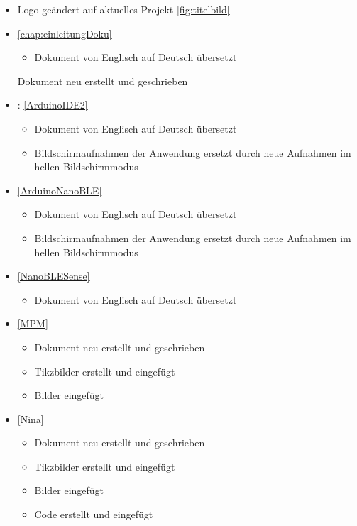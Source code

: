 \begin{itemize}
	\item {} Logo geändert auf aktuelles Projekt \ref{fig:titelbild}
	\item {}\ref{chap:einleitungDoku}
\begin{itemize}
	\item Dokument von Englisch auf Deutsch übersetzt
\end{itemize} Dokument neu erstellt und geschrieben 

\item {}: \ref{ArduinoIDE2}
\begin{itemize}
	\item Dokument von Englisch auf Deutsch übersetzt
	\item Bildschirmaufnahmen der Anwendung ersetzt durch neue Aufnahmen im hellen Bildschirmmodus
\end{itemize}

\item {}\ref{ArduinoNanoBLE}
\begin{itemize}
	\item Dokument von Englisch auf Deutsch übersetzt
	\item Bildschirmaufnahmen der Anwendung ersetzt durch neue Aufnahmen im hellen Bildschirmmodus
\end{itemize}

\item {}\ref{NanoBLESense}
\begin{itemize}
	\item Dokument von Englisch auf Deutsch übersetzt
\end{itemize}

\item {}\ref{MPM}
\begin{itemize}
	\item Dokument neu erstellt und geschrieben 
	\item Tikzbilder erstellt und eingefügt
	\item Bilder eingefügt
\end{itemize}

\item {}\ref{Nina}
\begin{itemize}
	\item Dokument neu erstellt und geschrieben 
	\item Tikzbilder erstellt und eingefügt
	\item Bilder eingefügt
	\item Code erstellt und eingefügt
\end{itemize}


\end{itemize}
